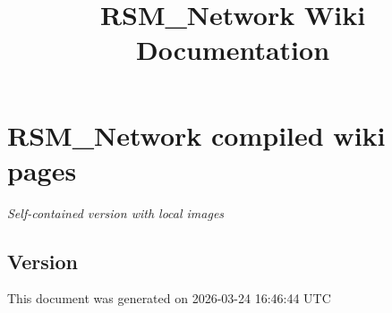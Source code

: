 \documentclass[
  11pt,
]{article}
\title{RSM\_Network Wiki Documentation}
\author{}
\date{}
\begin{document}
\maketitle

{
\hypersetup{linkcolor=}
\setcounter{tocdepth}{3}
\tableofcontents
}
\hypertarget{rsm_network-compiled-wiki-pages}{%
\section{RSM\_Network compiled wiki
pages}\label{rsm_network-compiled-wiki-pages}}

\emph{Self-contained version with local images}

\hypertarget{version}{%
\subsection{Version}\label{version}}

This document was generated on 2026-03-24 16:46:44 UTC
\end{document}
